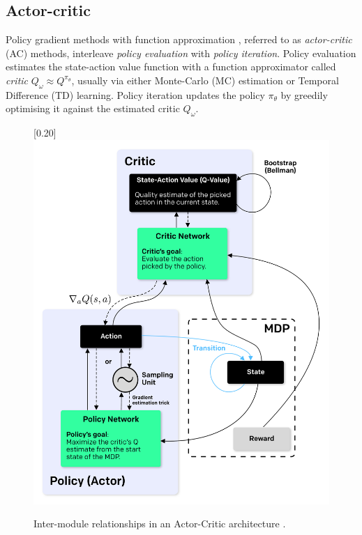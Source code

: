 \subsection*{Actor-critic}

Policy gradient methods with function approximation \cite{Sutton1999-ii},
referred to as \textit{actor-critic} (AC) methods,
interleave \textit{policy evaluation} with \textit{policy iteration}.
Policy evaluation estimates the state-action value function with a function
approximator called \textit{critic}
$Q_\omega \approx Q^{\pi_\theta}$, usually via either
Monte-Carlo (MC) estimation or Temporal Difference (TD) learning.
Policy iteration updates the policy $\pi_\theta$ by greedily optimising it
against the estimated critic $Q_\omega$.

\begin{figure}[h!]
\center
\scalebox{0.20}[0.20]{\includegraphics{Diags/ac_big}}
\caption{Inter-module relationships in an
Actor-Critic architecture \cite{Sutton1999-ii}.}
\label{fig:ac_big}
\end{figure}

